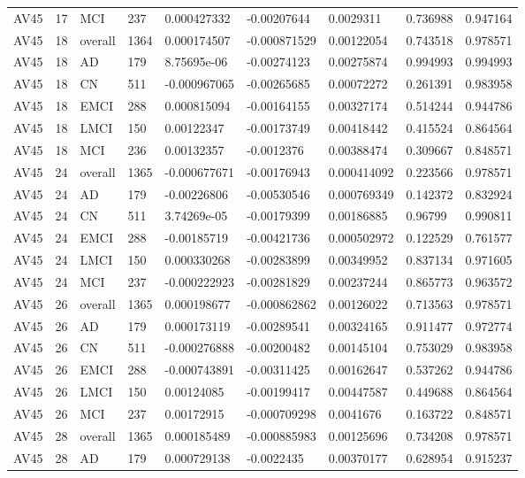 \begin{landscape}
\begin{longtable}{lllllllll}
AV45 & 17 & MCI & 237 & 0.000427332 & -0.00207644 & 0.0029311 & 0.736988 & 0.947164 \\
AV45 & 18 & overall & 1364 & 0.000174507 & -0.000871529 & 0.00122054 & 0.743518 & 0.978571 \\
AV45 & 18 & AD & 179 & 8.75695e-06 & -0.00274123 & 0.00275874 & 0.994993 & 0.994993 \\
AV45 & 18 & CN & 511 & -0.000967065 & -0.00265685 & 0.00072272 & 0.261391 & 0.983958 \\
AV45 & 18 & EMCI & 288 & 0.000815094 & -0.00164155 & 0.00327174 & 0.514244 & 0.944786 \\
AV45 & 18 & LMCI & 150 & 0.00122347 & -0.00173749 & 0.00418442 & 0.415524 & 0.864564 \\
AV45 & 18 & MCI & 236 & 0.00132357 & -0.0012376 & 0.00388474 & 0.309667 & 0.848571 \\
AV45 & 24 & overall & 1365 & -0.000677671 & -0.00176943 & 0.000414092 & 0.223566 & 0.978571 \\
AV45 & 24 & AD & 179 & -0.00226806 & -0.00530546 & 0.000769349 & 0.142372 & 0.832924 \\
AV45 & 24 & CN & 511 & 3.74269e-05 & -0.00179399 & 0.00186885 & 0.96799 & 0.990811 \\
AV45 & 24 & EMCI & 288 & -0.00185719 & -0.00421736 & 0.000502972 & 0.122529 & 0.761577 \\
AV45 & 24 & LMCI & 150 & 0.000330268 & -0.00283899 & 0.00349952 & 0.837134 & 0.971605 \\
AV45 & 24 & MCI & 237 & -0.000222923 & -0.00281829 & 0.00237244 & 0.865773 & 0.963572 \\
AV45 & 26 & overall & 1365 & 0.000198677 & -0.000862862 & 0.00126022 & 0.713563 & 0.978571 \\
AV45 & 26 & AD & 179 & 0.000173119 & -0.00289541 & 0.00324165 & 0.911477 & 0.972774 \\
AV45 & 26 & CN & 511 & -0.000276888 & -0.00200482 & 0.00145104 & 0.753029 & 0.983958 \\
AV45 & 26 & EMCI & 288 & -0.000743891 & -0.00311425 & 0.00162647 & 0.537262 & 0.944786 \\
AV45 & 26 & LMCI & 150 & 0.00124085 & -0.00199417 & 0.00447587 & 0.449688 & 0.864564 \\
AV45 & 26 & MCI & 237 & 0.00172915 & -0.000709298 & 0.0041676 & 0.163722 & 0.848571 \\
AV45 & 28 & overall & 1365 & 0.000185489 & -0.000885983 & 0.00125696 & 0.734208 & 0.978571 \\
AV45 & 28 & AD & 179 & 0.000729138 & -0.0022435 & 0.00370177 & 0.628954 & 0.915237 \\

\end{longtable}
\end{landscape}
